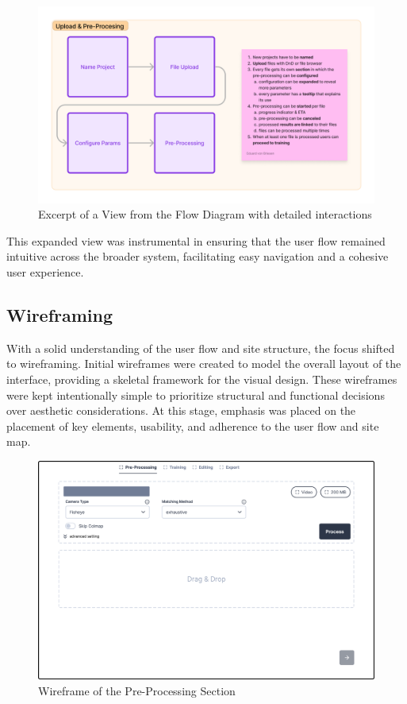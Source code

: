 \begin{figure}[htb]
  \includegraphics[width=\textwidth]{figures/flow-2.png}
  \caption{Excerpt of a View from the Flow Diagram with detailed interactions}
  \label{fig:design:flow-2}
\end{figure}

This expanded view was instrumental in ensuring that the user flow remained intuitive across the broader system, facilitating easy navigation and a cohesive user experience.

\subsection*{Wireframing}

With a solid understanding of the user flow and site structure, the focus shifted to wireframing. 
Initial wireframes were created to model the overall layout of the interface, providing a skeletal framework for the visual design. 
These wireframes were kept intentionally simple to prioritize structural and functional decisions over aesthetic considerations.
At this stage, emphasis was placed on the placement of key elements, usability, and adherence to the user flow and site map.

\begin{figure}[htb]
  \includegraphics[width=\textwidth]{figures/wireframe.png}
  \caption{Wireframe of the Pre-Processing Section}
  \label{fig:design:wireframe}
\end{figure}


